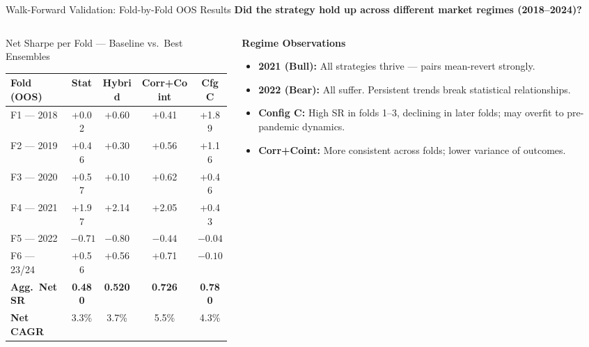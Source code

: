 \documentclass[aspectratio=169,10pt]{beamer}
\begin{document}
\begin{frame}{Walk-Forward Validation: Fold-by-Fold OOS Results}
  \small\textbf{Did the strategy hold up across different market regimes (2018--2024)?}
  \vspace{4pt}
  \begin{columns}[T]
    \begin{column}{0.54\textwidth}
      \begin{block}{Net Sharpe per Fold --- Baseline vs.\ Best Ensembles}
        \centering\scriptsize\renewcommand{\arraystretch}{1.3}
        \begin{tabular}{lcccc}
          \toprule
          \textbf{Fold (OOS)} & \textbf{Stat} & \textbf{Hybrid} & \textbf{Corr+Coint} & \textbf{Cfg C} \\
          \midrule
          F1 --- 2018 & +0.02 & +0.60 & +0.41 & +1.89 \\
          F2 --- 2019 & +0.46 & +0.30 & +0.56 & +1.16 \\
          F3 --- 2020 & +0.57 & +0.10 & +0.62 & +0.46 \\
          F4 --- 2021 & +1.97 & +2.14 & +2.05 & +0.43 \\
          F5 --- 2022 & $-0.71$ & $-0.80$ & $-0.44$ & $-0.04$ \\
          F6 --- 23/24 & +0.56 & +0.56 & +0.71 & $-0.10$ \\
          \midrule
          \textbf{Agg.\ Net SR} & \textbf{0.480} & \textbf{0.520} & \textbf{0.726} & \textbf{0.780} \\
          \textbf{Net CAGR}     & 3.3\% & 3.7\% & 5.5\% & 4.3\% \\
          \bottomrule
        \end{tabular}
      \end{block}
    \end{column}
    \begin{column}{0.43\textwidth}
      \textbf{Regime Observations}
      \begin{itemize}\itemsep4pt
        \item \textbf{2021 (Bull):} All strategies thrive --- pairs mean-revert strongly.
        \item \textbf{2022 (Bear):} All suffer. Persistent trends break statistical relationships.
        \item \textbf{Config C:} High SR in folds 1--3, declining in later folds; may overfit to pre-pandemic dynamics.
        \item \textbf{Corr+Coint:} More consistent across folds; lower variance of outcomes.
      \end{itemize}
    \end{column}
  \end{columns}
\end{frame}
\end{document}
